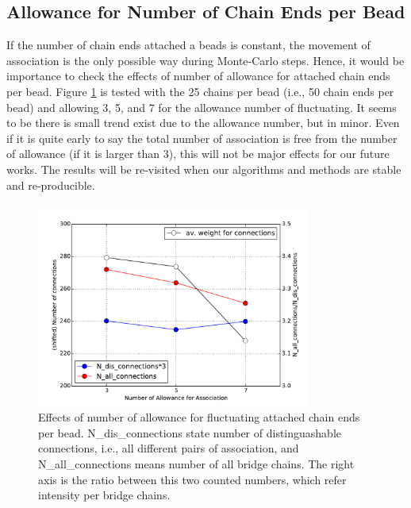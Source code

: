 \documentclass[10pt, a4paper]{report}
\begin{document}

\subsection{Allowance for Number of Chain Ends per Bead}
If the number of chain ends attached a beads is constant, the movement of association is the only possible way during Monte-Carlo steps. Hence, it would be importance to check the effects of number of allowance for attached chain ends per bead. Figure \ref{fig:TN_effect} is tested with the 25 chains per bead (i.e., 50 chain ends per bead) and allowing 3, 5, and 7 for the allowance number of fluctuating. It seems to be there is small trend exist due to the allowance number, but in minor. Even if it is quite early to say the total number of association is free from the number of allowance (if it is larger than 3), this will not be major effects for our future works. The results will be re-visited when our algorithms and methods are stable and re-producible.

\begin{figure}
  \centering
  \includegraphics[width=0.8\textwidth]{figures/TN_effect.pdf}
  \caption{Effects of number of allowance for fluctuating attached chain ends per bead. N{\_}dis{\_}connections state number of distinguashable connections, i.e., all different pairs of association, and N{\_}all{\_}connections means number of all bridge chains. The right axis is the ratio between this two counted numbers, which refer intensity per bridge chains.}
  \label{fig:TN_effect}
\end{figure}
\end{document}
